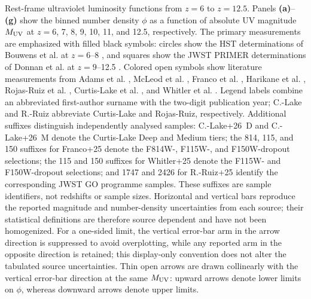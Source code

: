 \caption{\label{fig:uvlf-z6-12p5}
Rest-frame ultraviolet luminosity functions from $z=6$ to $z=12.5$.
Panels \textbf{(a)}--\textbf{(g)} show the binned number density
$\phi$ as a function of absolute UV magnitude $M_{\rm UV}$ at
$z=6$, 7, 8, 9, 10, 11, and 12.5, respectively.
The primary measurements are emphasized with filled black symbols:
circles show the HST determinations of Bouwens et al. at $z=6$--8
\citep{Bouwens2021UVLF}, and squares show the JWST PRIMER
determinations of Donnan et al. at $z=9$--12.5
\citep{Donnan2024PRIMER}.
Colored open symbols show literature measurements from
Adams et al. \citep{Adams2024EPOCHS}, McLeod et al. \citep{McLeod2024UVLF},
Franco et al.
\citep{Franco2025COSMOSWeb}, Harikane et al.
\citep{Harikane2025Spectroscopic}, Rojas-Ruiz et al.
\citep{RojasRuiz2025BoRG}, Curtis-Lake et al.
\citep{CurtisLake2026JADESDR4}, and Whitler et al.
\citep{Whitler2026JADES}.
Legend labels combine an abbreviated first-author surname with the
two-digit publication year; \mbox{C.-Lake} and
\mbox{R.-Ruiz} abbreviate Curtis-Lake and Rojas-Ruiz,
respectively. Additional suffixes distinguish independently analysed
samples: \mbox{C.-Lake+26 D} and \mbox{C.-Lake+26 M} denote the
Curtis-Lake Deep and Medium tiers; the 814, 115, and 150 suffixes for
Franco+25 denote the F814W-, F115W-, and F150W-dropout selections;
the 115 and 150 suffixes for Whitler+25 denote the F115W- and
F150W-dropout selections; and 1747 and 2426 for R.-Ruiz+25 identify
the corresponding JWST GO programme samples. These suffixes are
sample identifiers, not redshifts or sample sizes.
Horizontal and vertical bars reproduce the reported magnitude and
number-density uncertainties from each source; their statistical
definitions are therefore source dependent and have not been
homogenized. For a one-sided limit, the vertical error-bar arm in the
arrow direction is suppressed to avoid overplotting, while any
reported arm in the opposite direction is retained; this display-only
convention does not alter the tabulated source uncertainties. Thin
open arrows are drawn collinearly with the vertical error-bar direction
at the same $M_{\rm UV}$: upward arrows denote lower limits on $\phi$,
whereas downward arrows denote upper limits.
}
